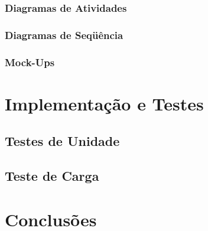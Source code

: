 \documentclass[
  10.5pt,				  %
	openright,			%
	twoside,			  %
  a5paper,
  chapter=TITLE,	%
	section=TITLE,	%
  hyphens,        %
	english,        %
	brazil          %
]{abntex2}
\begin{document}
\subsection{Diagramas de Atividades}
\subsection{Diagramas de Seqüência}
\subsection{Mock-Ups}


\chapter{Implementação e Testes}

\section{Testes de Unidade}

\section{Teste de Carga}



\chapter{Conclusões}





%
\end{document}
